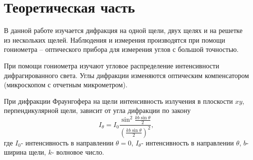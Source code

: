 
\usepackage{setspace}
\usepackage{amsmath}

\DeclareMathOperator{\sinc}{sinc}
\newcommand{\dif}[3]{


\pgfplotstablegetelem{0}{#2}\of#1

\pgfplotstablecreatecol
    [expr={\thisrow{#2} - \pgfplotsretval}]
    {LocalDistance#3}{#1}

\pgfplotstablecreatecol
    [expr={-\thisrow{LocalDistance#3} + \prevrow{LocalDistance#3}}]
    {#3}{#1}

}
\newcommand{\Exp}[1]{
	\exp\left(#1\right)
}
\newcommand{\Sinc}[1]{
	\sinc\left(#1\right)
}
\newcommand{\Sin}[1]{
	\sin\left(#1\right)
}


\def\labauthors{Понур К.А., Сарафанов Ф.Г., Сидоров Д.А.}
\def\labgroup{420}
\def\labnumber{320}
\def\labtheme{Дифракций Фраунгофера}
\renewcommand{\vec}{\mathbf}
\renewcommand{\Re}{\operatorname{Re}}
\renewcommand{\Im}{\operatorname{Im}}
\renewcommand{\phi}{\varphi}
\renewcommand{\kappa}{\varkappa}
\renewcommand{\hat}{\widehat}

\begin{spacing}{1}
\tableofcontents
\end{spacing}
\newpage
 \section{Теоретическая часть}
В данной работе изучается дифракция на одной щели, двух щелях и на решетке из нескольких щелей. Наблюдения и измерения производятся при помощи гониометра -- оптического прибора для измерения углов с большой точностью. 

При помощи гониометра изучают угловое распределение интенсивности дифрагированного света. Углы дифракции изменяются оптическим компенсатором (микроскопом с отчетным микрометром).

При дифракции Фраунгофера на щели интенсивность излучения в плоскости $xy$, перпендикулярной щели, зависит от угла дифракции по закону
\begin{equation}
	I_{\theta}=I_0\frac{\sin^2\frac{kb\sin\theta}{2}}{(\frac{kb\sin\theta}{2})^2},		
\end{equation}
где $I_0$- интенсивность в направлении $\theta=0$, $I_{\theta}$- интенсивность в направлении $\theta$, $b$- ширина щели, $k$- волновое число.

